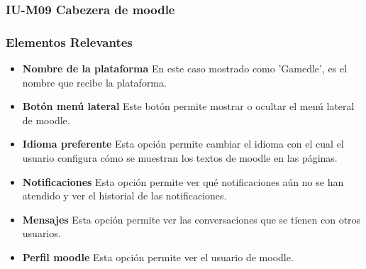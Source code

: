 
\subsubsection{IU-M09 Cabezera de moodle}


\subsubsection{Elementos Relevantes}

    \begin{itemize}
        \item {\bf Nombre de la plataforma}
            En este caso mostrado como 'Gamedle', es el nombre que recibe la plataforma.
        \item {\bf Botón menú lateral}
            Este botón permite mostrar o ocultar el menú lateral de moodle.
        \item {\bf Idioma preferente}
            Esta opción permite cambiar el idioma con el cual el usuario configura cómo se muestran los textos de moodle en las páginas.
        \item {\bf Notificaciones}
            Esta opción permite ver qué notificaciones aún no se han atendido y ver el historial de las notificaciones.
        \item {\bf Mensajes}
            Esta opción permite ver las conversaciones que se tienen con otros usuarios.
        \item {\bf Perfil moodle}
            Esta opción permite ver el usuario de moodle.
    \end{itemize}


\clearpage

